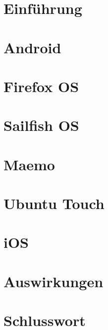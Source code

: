 \documentclass[a4paper,10pt,titlepage,twoside]{article}
\begin{document}
	
	\cleardoublepage
	
	\tableofcontents
	\cleardoublepage
	
	\pagestyle{fancyplain}
	\setcounter{page}{1}
	\newcommand{\HRule}{\rule{\linewidth}{0.5mm}}
	\fancyhead{}
	\fancyfoot{}
	\fancyfoot[RO,LE]{\thepage}
	\begin{multicols*}{2}

		\section{Einführung}
		
		\pagebreak
		
		\section{Android}
		
		\pagebreak
		
		\section{Firefox OS}
		
		\pagebreak
		
		\section{Sailfish OS}
		
		\pagebreak
		
		\section{Maemo}
		
		\pagebreak
		
		\section{Ubuntu Touch}
		
		\newline
		\newline
		
		\section{iOS}
		
		\pagebreak
		
		\section {Auswirkungen}
		
		\vfill
		\columnbreak
		
		\section{Schlusswort}
		
		\pagebreak
		
		\printbibliography
	\end{multicols*}
\end{document}
